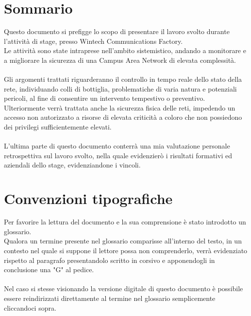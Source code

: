 \documentclass[Tesi.tex]{subfiles}
\begin{document}
\clearpage\thispagestyle{empty}
	
\renewcommand{\chaptername}{}
\renewcommand{\thechapter}{}
\chapter{Sommario}
Questo documento si prefigge lo scopo di presentare il lavoro svolto durante l'attività di stage, presso Wintech Communications Factory. \\
Le attività sono state intraprese nell'ambito sistemistico, andando a monitorare e a migliorare la sicurezza di una Campus Area Network di elevata complessità. \\\\

Gli argomenti trattati riguarderanno il controllo in tempo reale dello stato della rete, individuando colli di bottiglia, problematiche di varia natura e potenziali pericoli, al fine di consentire un intervento tempestivo o preventivo.\\
Ulteriormente verrà trattata anche la sicurezza fisica delle reti, impedendo un accesso non autorizzato a risorse di elevata criticità a coloro che non possiedono dei privilegi sufficientemente elevati. \\\\

L'ultima parte di questo documento conterrà una mia valutazione personale retrospettiva sul lavoro svolto, nella quale evidenzierò i risultati formativi ed aziendali dello stage, evidenziandone i vincoli. \\

\newpage
\chapter{Convenzioni tipografiche}
Per favorire la lettura del documento e la sua comprensione è stato introdotto un glossario. \\
Qualora un termine presente nel glossario comparisse all'interno del testo, in un contesto nel quale si suppone il lettore possa non comprenderlo, verrà evidenziato rispetto al paragrafo presentandolo scritto in corsivo e apponendogli in conclusione una "G" al pedice. \\\\
Nel caso si stesse visionando la versione digitale di questo documento è possibile essere reindirizzati direttamente al termine nel glossario semplicemente cliccandoci sopra. \\


\clearpage
\end{document}
